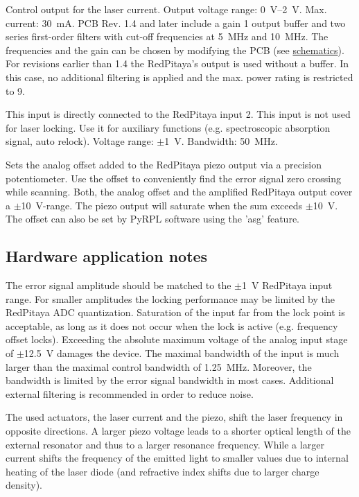 \documentclass[twoside,a4paper]{refart}
\begin{document}
 
Control output for the laser current. Output voltage range: \qty{0}{\volt}--\qty{2}{\volt}. Max. current: \qty{30}{\milli\ampere}. PCB Rev. 1.4 and later include a gain 1 output buffer and two series first-order filters with cut-off frequencies at \qty{5}{\mega\hertz} and \qty{10}{\mega\hertz}. The frequencies and the gain can be chosen by modifying the PCB (see \href{https://github.com/TU-Darmstadt-APQ/RedPitaya-Lockbox/tree/master/pcb}{schematics}). For revisions earlier than 1.4 the RedPitaya's output is used without a buffer. In this case, no additional filtering is applied and the max. power rating is restricted to \qty{9}{\dBm}.

 
This input is directly connected to the RedPitaya input 2. This input is not used for laser locking. Use it for auxiliary functions (e.g. spectroscopic absorption signal, auto relock). Voltage range: $\pm$\qty{1}{\volt}. Bandwidth: \qty{50}{\mega\hertz}.

 
Sets the analog offset added to the RedPitaya piezo output via a precision potentiometer. Use the offset to conveniently find the error signal zero crossing while scanning. Both, the analog offset and the amplified RedPitaya output cover a $\pm$\qty{10}{\volt}-range. The piezo output will saturate when the sum exceeds $\pm$\qty{10}{\volt}. The offset can also be set by PyRPL software using the 'asg' feature.

\subsection{Hardware application notes}

The error signal amplitude should be matched to the $\pm$\qty{1}{\volt} RedPitaya input range. For smaller amplitudes the locking performance may be limited by the RedPitaya ADC quantization. Saturation of the input far from the lock point is acceptable, as long as it does not occur when the lock is active (e.g. frequency offset locks).  Exceeding the absolute maximum voltage of the analog input stage of $\pm$\qty{12.5}{\volt} damages the device. The maximal bandwidth of the input is much larger than the maximal control bandwidth of \qty{1.25}{\mega\hertz}. Moreover, the bandwidth is limited by the error signal bandwidth in most cases. Additional external filtering is recommended in order to reduce noise.

The used actuators, the laser current and the piezo, shift the laser frequency in opposite directions. A larger piezo voltage leads to a shorter optical length of the external resonator and thus to a larger resonance frequency. While a larger current shifts the frequency of the emitted light to smaller values due to internal heating of the laser diode (and refractive index shifts due to larger charge density).  
\end{document}
